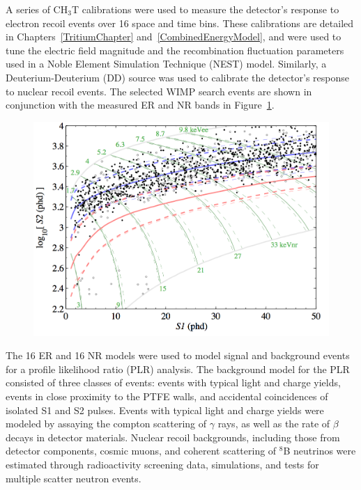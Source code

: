 A series of CH$_3$T calibrations were used to measure the detector's response to electron recoil events over 16 space and time bins.  These calibrations are detailed in Chapters~\ref{TritiumChapter} and~\ref{CombinedEnergyModel}, and were used to tune the electric field magnitude and the recombination fluctuation parameters used in a Noble Element Simulation Technique (NEST) model.  Similarly, a Deuterium-Deuterium (DD) source was used to calibrate the detector's response to nuclear recoil events.  The selected WIMP search events are shown in conjunction with the measured ER and NR bands in Figure~\ref{Run4Events}.  

 \begin{figure} 
\includegraphics[scale=.4]{Run4events.png} 
\label{Run4Events}
\end{figure}

The 16 ER and 16 NR models were used to model signal and background events for a profile likelihood ratio (PLR) analysis. The background model for the PLR consisted of three classes of events:  events with typical light and charge yields, events in close proximity to the PTFE walls, and accidental coincidences of isolated S1 and S2 pulses.  Events with typical light and charge yields were modeled by assaying the compton scattering of $\gamma$ rays, as well as the rate of $\beta$ decays in detector materials.  Nuclear recoil backgrounds, including those from detector components, cosmic muons, and coherent scattering of $^8$B neutrinos were estimated through radioactivity screening data, simulations, and tests for multiple scatter neutron events. 

